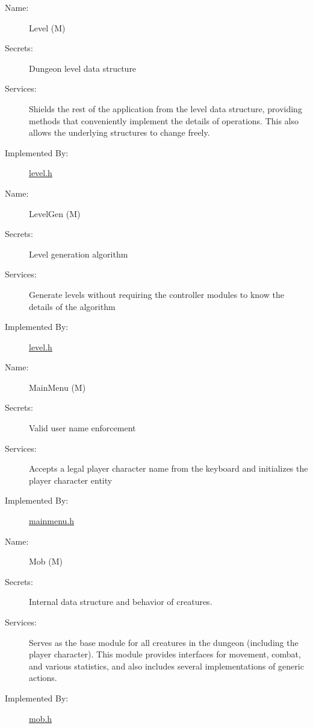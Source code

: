 \documentclass[12pt, titlepage]{article}
\newcommand{\rev}[1]{\textcolor{RevisionColour}{#1}}
\newcounter{mnum}
\newcommand{\mdprint}[1]{\addtocounter{mnum}{1} #1 (M\themnum)}
\begin{document}
        \bigskip\begin{description}
            \item[Name:]\mdprint{Level}
            \item[Secrets:]Dungeon level data structure
            \item[Services:]Shields the rest of the application from the level data structure, providing methods that conveniently implement the details of operations. This also allows the underlying structures to change freely.
            \item[Implemented By:]\href{run:../../../src/include/level.h}{level.h}
        \end{description}

        \bigskip\begin{description}
            \item[Name:]\mdprint{LevelGen}
            \item[Secrets:]Level generation algorithm
            \item[Services:]Generate levels without requiring the controller modules to know the details of the algorithm
            \item[Implemented By:]\href{run:../../../src/include/level.h}{level.h}
        \end{description}

        \bigskip\begin{description}
            \item[Name:]\mdprint{MainMenu}
            \item[Secrets:]Valid user name enforcement
            \item[Services:]Accepts a legal player character name from the keyboard and initializes the player character entity
            \item[Implemented By:]\href{run:../../../src/include/mainmenu.h}{mainmenu.h}
        \end{description}

        \bigskip\begin{description}
            \item[\rev{Name:}]\mdprint{\rev{Mob}}
            \item[\rev{Secrets:}]\rev{Internal data structure and behavior of creatures.}
            \item[\rev{Services:}]\rev{Serves as the base module for all creatures in the dungeon (including the player character).  This module provides interfaces for movement, combat, and various statistics, and also includes several implementations of generic actions.}
            \item[\rev{Implemented By:}]\href{run:../../../src/include/mob.h}{mob.h}
        \end{description}
\end{document}
